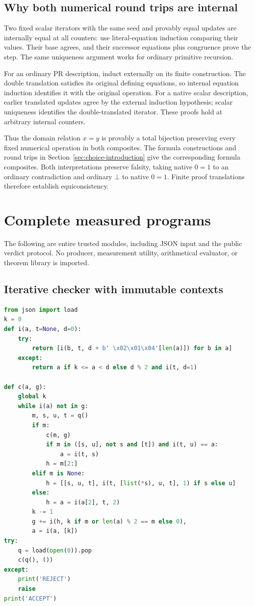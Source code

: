 \documentclass[11pt,letterpaper]{article}
\theoremstyle{definition}\newtheorem{definition}[theorem]{Definition}
\theoremstyle{remark}\newtheorem{remark}[theorem]{Remark}
\begin{document}
\subsection{Why both numerical round trips are internal}

Two fixed scalar iterators with the same seed and provably equal
updates are internally equal at all counters: use literal-equation
induction comparing their values. Their base agrees, and their
successor equations plus congruence prove the step. The same
uniqueness argument works for ordinary primitive recursion.

For an ordinary PR description, induct externally on its finite
construction. The double translation satisfies its original
defining equations, so internal equation induction identifies it
with the original operation. For a native scalar description,
earlier translated updates agree by the external induction
hypothesis; scalar uniqueness identifies the double-translated
iterator. These proofs hold at arbitrary internal counters.

Thus the domain relation $x=y$ is provably a total bijection
preserving every fixed numerical operation in both composites.
The formula constructions and round trips in
Section~\ref{sec:choice-introduction} give the corresponding formula
composites. Both interpretations preserve falsity, taking native
$0=1$ to an ordinary contradiction and ordinary $\bot$ to native
$0=1$. Finite proof translations therefore establish equiconsistency.

\clearpage
\section{Complete measured programs}
The following are entire trusted modules, including JSON input and
the public verdict protocol. No producer, measurement utility,
arithmetical evaluator, or theorem library is imported.
\subsection{Iterative checker with immutable contexts}
\begin{lstlisting}[language=Python]
from json import load
k = 0
def i(a, t=None, d=0):
    try:
        return [i(b, t, d + b' \x02\x01\x04'[len(a)]) for b in a]
    except:
        return a if k <= a < d else d % 2 and i(t, d=1)

def c(a, g):
    global k
    while i(a) not in g:
        m, s, u, t = q()
        if m:
            c(m, g)
            if m in ([s, u], not s and [t]) and i(t, u) == a:
                a = i(t, s)
            h = m[2:]
        elif m is None:
            h = [[s, u, t], i(t, [list(*s), u, t], 1) if s else u]
        else:
            h = a = i(a[2], t, 2)
        k -= 1
        g += i(h, k if m or len(a) % 2 == m else 0),
        a = i(a, [k])
try:
    q = load(open(0)).pop
    c(q(), ())
except:
    print('REJECT')
    raise
print('ACCEPT')
\end{lstlisting}
\clearpage
\end{document}
